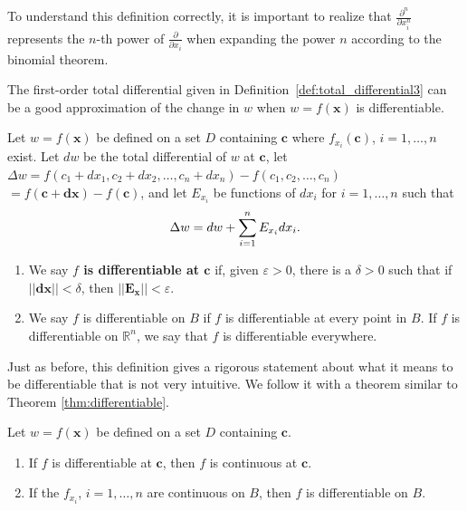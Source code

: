 To understand this definition correctly, it is important to realize that $\frac{\partial^n}{\partial x_i^n}$ represents the $n$-th power of $\frac{\partial}{\partial x_i}$ when expanding the power $n$ according to the binomial theorem. 

The first-order total differential given in Definition~\ref{def:total_differential3} can be a good approximation of the change in $w$ when $w = f(\mathbf{x})$ is differentiable.

\begin{definition}\label{def:multi_differentiability3}
Let $w=f(\mathbf{x})$ be defined on a set $D$ containing $\mathbf{c}$ where $f_{x_i}(\mathbf{c})$, $i=1,\ldots,n$ exist. Let $dw$ be the total differential of $w$ at $\mathbf{c}$, let $\Delta w = f(c_1+dx_1,c_2+dx_2,\ldots,c_n+dx_n) - f(c_1,c_2, \ldots, c_n)$ \\$=f(\mathbf{c}+\mathbf{dx}) - f(\mathbf{c})$, and let $E_{x_i}$ be functions of $dx_i$ for $i=1,\ldots,n$  such that
$$\Delta w = dw + \displaystyle\sum\limits_{i=1}^nE_{x_i}dx_i.$$
\begin{enumerate}
	\item We say \textbf{$f$ is differentiable at $\mathbf{c}$} if, given $\varepsilon >0$, there is a $\delta >0$ such that if $||\mathbf{dx}|| < \delta$, then $||\mathbf{E_x}|| < \varepsilon$. 
	\item	We say $f$ is differentiable on $B$ if $f$ is differentiable at every point in $B$. If $f$ is differentiable on $\mathbb{R}^n$, we say that $f$ is differentiable everywhere.
\end{enumerate}
\end{definition}

Just as before, this definition gives a rigorous statement about what it means to be differentiable that is not very intuitive. We follow it with a theorem similar to Theorem \ref{thm:differentiable}.

\begin{theorem}\label{thm:differentiable3}
Let $w=f(\mathbf{x})$ be defined on a set $D$ containing $\mathbf{c}$. 
\begin{enumerate}
\item	If $f$ is differentiable at $\mathbf{c}$, then $f$ is continuous at $\mathbf{c}$.
\item If the $f_{x_i}$, $i=1,\ldots,n$ are continuous on $B$, then $f$ is differentiable on $B$.
\end{enumerate}
\end{theorem}






